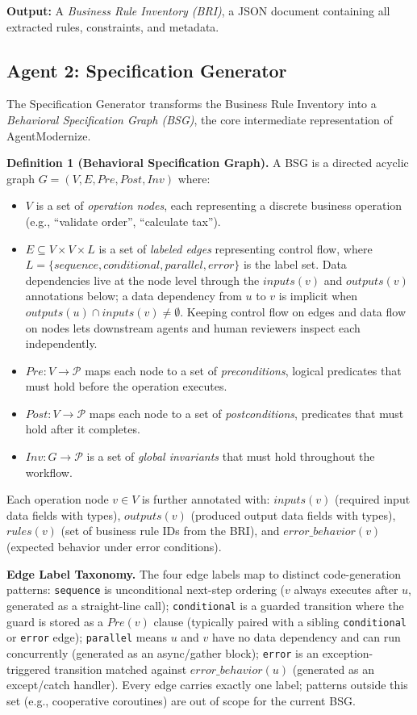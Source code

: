 \documentclass[conference]{IEEEtran}
\begin{document}
\textbf{Output:} A \textit{Business Rule Inventory (BRI)}, a JSON document containing all extracted rules, constraints, and metadata.

\subsection{Agent 2: Specification Generator}

The Specification Generator transforms the Business Rule Inventory into a \textit{Behavioral Specification Graph (BSG)}, the core intermediate representation of AgentModernize.

\textbf{Definition 1 (Behavioral Specification Graph).} A BSG is a directed acyclic graph $G = (V, E, Pre, Post, Inv)$ where:

\begin{itemize}
    \item $V$ is a set of \textit{operation nodes}, each representing a discrete business operation (e.g., ``validate order'', ``calculate tax'').
    \item $E \subseteq V \times V \times L$ is a set of \textit{labeled edges} representing control flow, where $L = \{sequence, conditional, parallel, error\}$ is the label set. Data dependencies live at the node level through the $inputs(v)$ and $outputs(v)$ annotations below; a data dependency from $u$ to $v$ is implicit when $outputs(u) \cap inputs(v) \neq \emptyset$. Keeping control flow on edges and data flow on nodes lets downstream agents and human reviewers inspect each independently.
    \item $Pre: V \rightarrow \mathcal{P}$ maps each node to a set of \textit{preconditions}, logical predicates that must hold before the operation executes.
    \item $Post: V \rightarrow \mathcal{P}$ maps each node to a set of \textit{postconditions}, predicates that must hold after it completes.
    \item $Inv: G \rightarrow \mathcal{P}$ is a set of \textit{global invariants} that must hold throughout the workflow.
\end{itemize}

Each operation node $v \in V$ is further annotated with: $inputs(v)$ (required input data fields with types), $outputs(v)$ (produced output data fields with types), $rules(v)$ (set of business rule IDs from the BRI), and $error\_behavior(v)$ (expected behavior under error conditions).

\textbf{Edge Label Taxonomy.} The four edge labels map to distinct code-generation patterns: \texttt{sequence} is unconditional next-step ordering ($v$ always executes after $u$, generated as a straight-line call); \texttt{conditional} is a guarded transition where the guard is stored as a $Pre(v)$ clause (typically paired with a sibling \texttt{conditional} or \texttt{error} edge); \texttt{parallel} means $u$ and $v$ have no data dependency and can run concurrently (generated as an async/gather block); \texttt{error} is an exception-triggered transition matched against $error\_behavior(u)$ (generated as an except/catch handler). Every edge carries exactly one label; patterns outside this set (e.g., cooperative coroutines) are out of scope for the current BSG.
\end{document}
